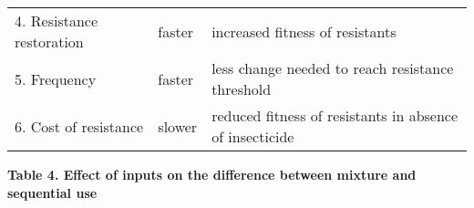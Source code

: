 \documentclass[11pt,]{article}
\begin{document}
\begin{longtable}[]{@{}lll@{}}
\begin{minipage}[t]{0.27\columnwidth}\raggedright\strut
4. Resistance restoration\strut
\end{minipage} & \begin{minipage}[t]{0.12\columnwidth}\raggedright\strut
faster\strut
\end{minipage} & \begin{minipage}[t]{0.52\columnwidth}\raggedright\strut
increased fitness of resistants\strut
\end{minipage}\tabularnewline
\begin{minipage}[t]{0.27\columnwidth}\raggedright\strut
5. Frequency\strut
\end{minipage} & \begin{minipage}[t]{0.12\columnwidth}\raggedright\strut
faster\strut
\end{minipage} & \begin{minipage}[t]{0.52\columnwidth}\raggedright\strut
less change needed to reach resistance threshold\strut
\end{minipage}\tabularnewline
\begin{minipage}[t]{0.27\columnwidth}\raggedright\strut
6. Cost of resistance\strut
\end{minipage} & \begin{minipage}[t]{0.12\columnwidth}\raggedright\strut
slower\strut
\end{minipage} & \begin{minipage}[t]{0.52\columnwidth}\raggedright\strut
reduced fitness of resistants in absence of insecticide\strut
\end{minipage}\tabularnewline
\bottomrule
\end{longtable}

\pagebreak

\textbf{Table 4. Effect of inputs on the difference between mixture and
sequential use}
\end{document}
